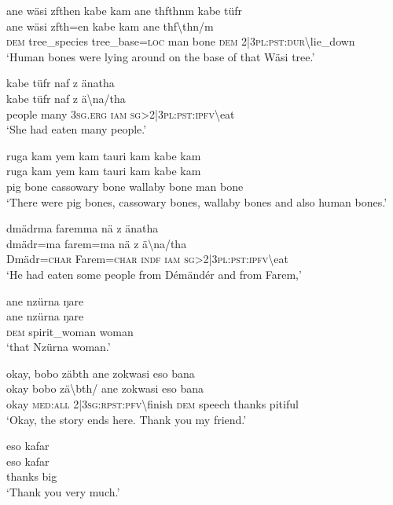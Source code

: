\ea\label{ex:8:a1868}
ane wäsi zfthen kabe kam ane thfthnm kabe tüfr\\
\gll ane	wäsi	zfth=en	kabe	kam	ane	thf{\textbackslash}thn/m\\
     \textsc{dem}	tree\_species	tree\_base=\textsc{loc}	man	bone	\textsc{dem}	2|3\textsc{pl}:\textsc{pst}:\textsc{dur}{\textbackslash}lie\_down\\
\glt `Human bones were lying around on the base of that Wäsi tree.'
\z

\ea\label{ex:8:a1871}
kabe tüfr naf z änatha\\
\gll kabe	tüfr	naf	z	ä{\textbackslash}na/tha\\
     people	many	3\textsc{sg}.\textsc{erg}	\textsc{iam}	\textsc{sg}>2|3\textsc{pl}:\textsc{pst}:\textsc{ipfv}{\textbackslash}eat\\
\glt `She had eaten many people.'
\z

\ea\label{ex:8:a1872}
ruga kam yem kam tauri kam kabe kam\\
\gll ruga	kam	yem	kam	tauri	kam	kabe	kam\\
     pig	bone	cassowary	bone	wallaby	bone	man	bone\\
\glt `There were pig bones, cassowary bones, wallaby bones and also human bones.'
\z

\ea\label{ex:8:a1874}
dmädrma faremma nä z änatha\\
\gll dmädr=ma	farem=ma	nä	z	ä{\textbackslash}na/tha\\
     Dmädr=\textsc{char}	Farem=\textsc{char}	\textsc{indf}	\textsc{iam}	\textsc{sg}>2|3\textsc{pl}:\textsc{pst}:\textsc{ipfv}{\textbackslash}eat\\
\glt `He had eaten some people from Démändér and from Farem,'
\z

\ea\label{ex:8:a1875}
ane nzürna ŋare\\
\gll ane	nzürna	ŋare\\
     \textsc{dem}	spirit\_woman	woman\\
\glt `that Nzürna woman.'
\z

\ea\label{ex:8:a1876}
okay, bobo zäbth ane zokwasi eso bana\\
\gll okay	bobo	zä{\textbackslash}bth/	ane	zokwasi	eso	bana\\
     okay	\textsc{med}:\textsc{all}	2|3\textsc{sg}:\textsc{rpst}:\textsc{pfv}{\textbackslash}finish	\textsc{dem}	speech	thanks	pitiful\\
\glt `Okay, the story ends here. Thank you my friend.'
\z

\ea\label{ex:8:a1877}
eso kafar\\
\gll eso	kafar\\
     thanks	big\\
\glt `Thank you very much.'
\z

